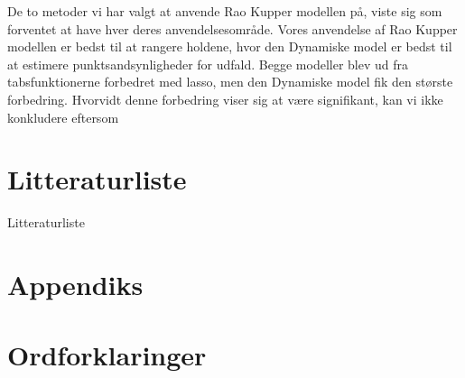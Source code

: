 \documentclass[11pt,a4paper]{article}
\begin{document}
De to metoder vi har valgt at anvende Rao Kupper modellen på, viste sig som forventet at have hver deres anvendelsesområde. Vores anvendelse af Rao Kupper modellen er bedst til at rangere holdene, hvor den Dynamiske model er bedst til at estimere punktsandsynligheder for udfald. Begge modeller blev ud fra tabsfunktionerne forbedret med lasso, men den Dynamiske model fik den største forbedring. Hvorvidt denne forbedring viser sig at være signifikant, kan vi ikke konkludere eftersom 
\clearpage
\section{Litteraturliste}
Litteraturliste
\clearpage
\section{Appendiks}

\clearpage
\printbibliography %
\section{Ordforklaringer}
\end{document}
